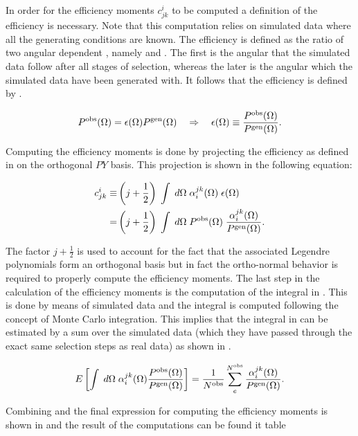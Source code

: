 In order for the efficiency moments $c^i_{jk}$ to be computed a definition of the efficiency is necessary. Note that this computation relies on
simulated data where all the generating conditions are known. The efficiency is defined as the ratio of two angular dependent \pdfs, namely
\Pobs and \Pgen. The first is the angular \pdf that the simulated data follow after all stages of selection, whereas
the later is the angular \pdf which the simulated data have been generated with. It follows that the efficiency is defined by .

\begin{equation}
  \centering
  \Pobs = \epsilon(\Omega) \Pgen \quad \Rightarrow \quad \epsilon(\Omega) \equiv \frac{\Pobs}{\Pgen}.
  \label{eff_def}
\end{equation}

\noindent Computing the efficiency moments is done by projecting the efficiency as defined in 
on the orthogonal $PY$ basis. This projection is shown in the following equation:

\begin{align}
  \centering
   c^i_{jk}  \equiv & \parenthesis{j + \frac{1}{2}} \; \int \; d\Omega \; \effbase \; \epsilon(\Omega) \nonumber \\
                 =  & \parenthesis{j + \frac{1}{2}} \; \int \; d\Omega \; \Pobs \; \frac{\effbase}{\Pgen}.
  \label{eff_moms_def}
\end{align}

\noindent The factor $j+\frac{1}{2}$ is used to account for the fact that the associated Legendre
polynomials form an orthogonal basis but in fact the ortho-normal behavior is required to properly compute the efficiency moments.
The last step in the calculation of the efficiency moments is the computation of the integral in .
This is done by means of simulated data and the integral is computed following the concept of Monte Carlo integration. This implies
that the integral in  can be estimated by a sum over the simulated data (which they have passed through the exact
same selection steps as real data) as shown in .

\begin{equation}
\centering
  E\left[ \int \; d\Omega \; \effbase \frac{\Pobs}{\Pgen} \right] = \frac{1}{\Nobs} \sum_e^{\Nobs} \frac{\effbase}{\Pgen}.
  \label{eff_moms_calc}
\end{equation}

\noindent Combining  and  the final expression for computing the efficiency moments is shown
in  and the result of the computations can be found it table 

